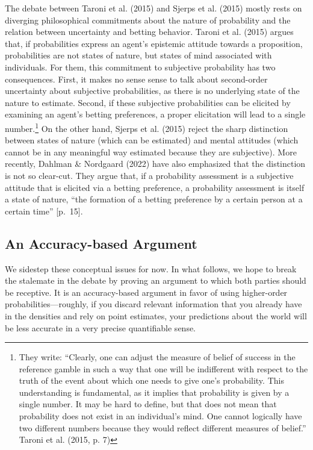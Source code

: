 \documentclass[
  10pt,
  dvipsnames,enabledeprecatedfontcommands]{scrartcl}
\begin{document}
The debate between Taroni et al. (2015) and Sjerps et al. (2015) mostly
rests on diverging philosophical commitments about the nature of
probability and the relation between uncertainty and betting behavior.
Taroni et al. (2015) argues that, if probabilities express an agent's
epistemic attitude towards a proposition, probabilities are not states
of nature, but states of mind associated with individuals. For them,
this commitment to subjective probability has two consequences. First,
it makes no sense sense to talk about second-order uncertainty about
subjective probabilities, as there is no underlying state of the nature
to estimate. Second, if these subjective probabilities can be elicited
by examining an agent's betting preferences, a proper elicitation will
lead to a single number.\footnote{They write: ``Clearly, one can adjust
  the measure of belief of success in the reference gamble in such a way
  that one will be indifferent with respect to the truth of the event
  about which one needs to give one's probability. This understanding is
  fundamental, as it implies that probability is given by a single
  number. It may be hard to define, but that does not mean that
  probability does not exist in an individual's mind. One cannot
  logically have two different numbers because they would reflect
  different measures of belief.'' Taroni et al. (2015, p. 7)} On the
other hand, Sjerps et al. (2015) reject the sharp distinction between
states of nature (which can be estimated) and mental attitudes (which
cannot be in any meaningful way estimated because they are subjective).
More recently, Dahlman \& Nordgaard (2022) have also emphasized that the
distinction is not so clear-cut. They argue that, if a probability
assessment is a subjective attitude that is elicited via a betting
preference, a probability assessment is itself a state of nature, ``the
formation of a betting preference by a certain person at a certain
time'' {[}p.~15{]}.

\hypertarget{an-accuracy-based-argument}{%
\subsection{An Accuracy-based
Argument}\label{an-accuracy-based-argument}}

We sidestep these conceptual issues for now. In what follows, we hope to
break the stalemate in the debate by proving an argument to which both
parties should be receptive. It is an accuracy-based argument in favor
of using higher-order probabilities---roughly, if you discard relevant
information that you already have in the densities and rely on point
estimates, your predictions about the world will be less accurate in a
very precise quantifiable sense.
\end{document}
